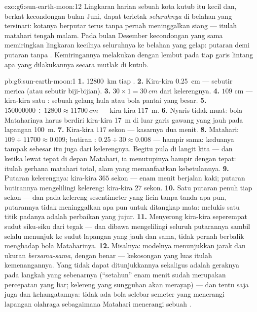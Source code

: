 \begin{solution}{exo:g6:sun-earth-moon:12}
Lingkaran harian sebuah kota kutub itu kecil dan, berkat kecondongan
bulan Juni, dapat terletak \emph{seluruhnya} di belahan yang tersinari:
kotanya berputar terus tanpa pernah meninggalkan  siang ---
itulah matahari tengah malam. Pada bulan Desember kecondongan yang
sama memiringkan lingkaran kecilnya seluruhnya ke belahan yang gelap:
putaran demi putaran tanpa . Kemiringannya melakukan
dengan lembut pada tiap garis lintang apa yang dilakukannya secara
mutlak di kutub.
\end{solution}

\begin{solution}{pb:g6:sun-earth-moon:1}
\textbf{1.} \qty{12800}{km} tiap .
\textbf{2.} Kira-kira \qty{0.25}{cm} --- sebutir merica (atau sebutir
biji-bijian).
\textbf{3.} $30 \times 1 = \qty{30}{cm}$ dari kelerengnya.
\textbf{4.} $109$ cm --- kira-kira satu : sebuah gelang hula atau
bola pantai yang besar.
\textbf{5.} $150000000 \div 12800 \approx \qty{11700}{cm}$ ---
kira-kira \qty{117}{m}.
\textbf{6.} Nyaris tidak muat: bola Mataharinya harus berdiri kira-kira
\qty{17}{m} di luar garis gawang yang jauh pada lapangan \qty{100}{m}.
\textbf{7.} Kira-kira $117$ sekon --- kasarnya dua menit.
\textbf{8.} Matahari: $109 \div 11700 \approx 0.009$; butiran :
$0.25 \div 30 \approx 0.008$ --- hampir sama: keduanya tampak sebesar
itu juga dari kelerengnya. Begitu pula di langit kita --- dan ketika
 lewat tepat di depan Matahari, ia menutupinya hampir dengan
tepat: itulah gerhana matahari total, alam yang memanfaatkan
kebetulannya.
\textbf{9.} Putaran kelerengnya: kira-kira $365$ sekon --- enam menit
berjalan kaki; putaran butirannya mengelilingi kelereng: kira-kira
$27$ sekon.
\textbf{10.} Satu putaran penuh tiap sekon --- dan pada kelereng
sesentimeter yang licin tanpa tanda apa pun, putarannya tidak
meninggalkan apa pun untuk ditangkap mata: melukis satu titik padanya
adalah perbaikan yang jujur.
\textbf{11.} Menyerong kira-kira seperempat sudut siku-siku dari tegak
--- dan dibawa mengelilingi seluruh putarannya sambil selalu menunjuk
ke sudut lapangan yang jauh dan sama, tidak pernah berbalik menghadap
bola Mataharinya.
\textbf{12.} Misalnya: modelnya menunjukkan jarak dan ukuran
\emph{bersama-sama}, dengan benar --- kekosongan yang luas itulah
kemenangannya. Yang tidak dapat ditunjukkannya sekaligus adalah
geraknya pada langkah yang sebenarnya (``setahun'' enam menit sudah
merupakan percepatan yang liar; kelereng yang sungguhan akan merayap)
--- dan tentu saja juga  dan kehangatannya: tidak ada bola
selebar semeter yang menerangi lapangan olahraga sebagaimana Matahari
menerangi sebuah .
\end{solution}
